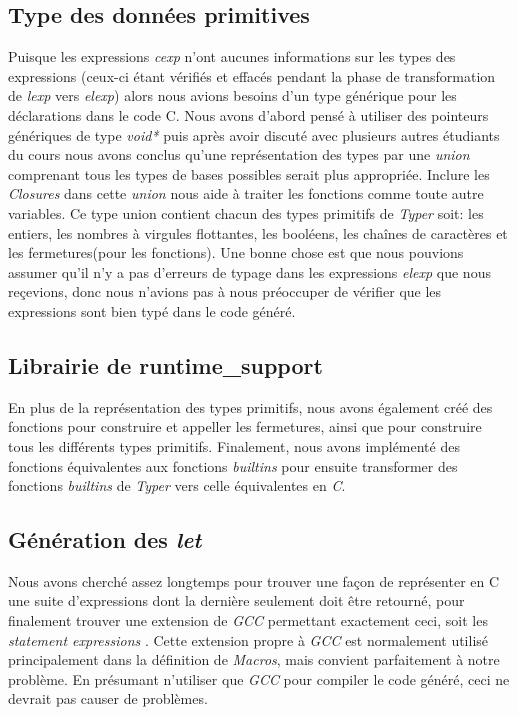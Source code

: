 \documentclass{article}
\begin{document}
\subsection{Type des données primitives}
Puisque les expressions \emph{cexp} n'ont aucunes informations sur les types
des expressions (ceux-ci étant vérifiés et effacés pendant la phase de 
transformation de \emph{lexp} vers \emph{elexp}) alors nous avions besoins d'un
type générique pour les déclarations dans le code C. Nous avons d'abord pensé à
utiliser des pointeurs génériques de type \emph{void*} puis après avoir discuté
avec plusieurs autres étudiants du cours nous avons conclus qu'une
représentation des types par une \emph{union} comprenant tous les types de bases
possibles serait plus appropriée. Inclure les \emph{Closures} dans cette
\emph{union} nous aide à traiter les fonctions comme toute autre variables.
Ce type union contient chacun des types primitifs de \emph{Typer} soit:
les entiers, les nombres à virgules flottantes, les booléens, les chaînes de
caractères et les fermetures(pour les fonctions). Une bonne chose est que nous
pouvions assumer qu'il n'y a pas d'erreurs de typage dans les expressions
\emph{elexp} que nous reçevions, donc nous n'avions pas à nous préoccuper de
vérifier que les expressions sont bien typé dans le code généré.

\subsection{Librairie de runtime\_support}
En plus de la représentation des types primitifs, nous avons également créé
des fonctions pour construire et appeller les fermetures, ainsi que pour
construire tous les différents types primitifs.
Finalement, nous avons implémenté des fonctions équivalentes aux fonctions
\textit{builtins} pour ensuite transformer des fonctions \textit{builtins}
de \emph{Typer} vers celle équivalentes en \emph{C}.

\subsection{Génération des \emph{let}}
Nous avons cherché assez longtemps pour trouver une façon de représenter en
C une suite d'expressions dont la dernière seulement doit être retourné, pour
finalement trouver une extension de \emph{GCC} permettant exactement ceci,
soit les \emph{statement expressions}\cite{gnu_bracedgroup}
\cite{stack_bracedgroup}. Cette extension propre
à \emph{GCC} est normalement utilisé principalement dans la définition de
\emph{Macros}, mais convient parfaitement à notre problème. En présumant
n'utiliser que \emph{GCC} pour compiler le code généré, ceci ne devrait pas
causer de problèmes.
\end{document}
